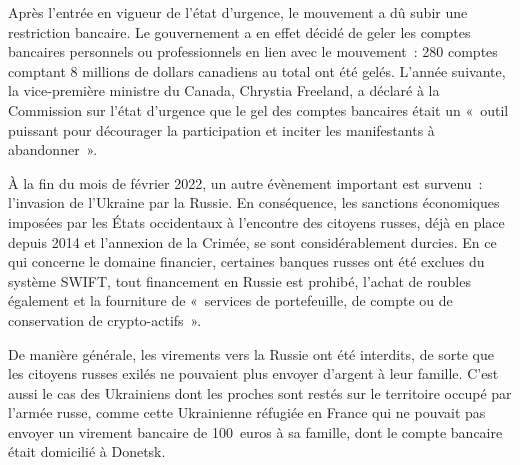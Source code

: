 Après l'entrée en vigueur de l'état d'urgence, le mouvement a dû subir une restriction bancaire. Le gouvernement a en effet décidé de geler les comptes bancaires personnels ou professionnels en lien avec le mouvement~: 280 comptes comptant 8 millions de dollars canadiens au total ont été gelés. L'année suivante, la vice-première ministre du Canada, Chrystia Freeland, a déclaré à la Commission sur l'état d'urgence que le gel des comptes bancaires était un «~outil puissant pour décourager la participation et inciter les manifestants à abandonner~».

À la fin du mois de février 2022, un autre évènement important est survenu~: l'invasion de l'Ukraine par la Russie. En conséquence, les sanctions économiques imposées par les États occidentaux à l'encontre des citoyens russes, déjà en place depuis 2014 et l'annexion de la Crimée, se sont considérablement durcies. En ce qui concerne le domaine financier, certaines banques russes ont été exclues du système SWIFT, tout financement en Russie est prohibé, l'achat de roubles également et la fourniture de «~services de portefeuille, de compte ou de conservation de crypto-actifs~». %

De manière générale, les virements vers la Russie ont été interdits, de sorte que les citoyens russes exilés ne pouvaient plus envoyer d'argent à leur famille. C'est aussi le cas des Ukrainiens dont les proches sont restés sur le territoire occupé par l'armée russe, comme cette Ukrainienne réfugiée en France qui ne pouvait pas envoyer un virement bancaire de 100~euros à sa famille, dont le compte bancaire était domicilié à Donetsk.

